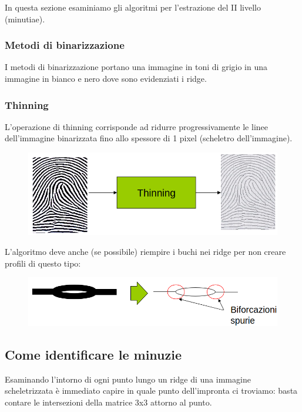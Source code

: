 In questa sezione esaminiamo gli algoritmi per l'estrazione del II livello (minutiae).

\subsubsection{Metodi di binarizzazione}

I metodi di binarizzazione portano una immagine in toni di
grigio in una immagine in bianco e nero dove sono
evidenziati i ridge.

\subsubsection{Thinning}

L’operazione di thinning corrisponde ad ridurre
progressivamente le linee dell’immagine
binarizzata fino allo spessore di 1 pixel (scheletro
dell’immagine).

\begin{figure}[ht]
    \centering
    \includegraphics[width=0.75\linewidth]{chapters/images-chap6/thinning.png}
\end{figure}

\newpage
\noindent L’algoritmo deve anche (se possibile) riempire i
buchi nei ridge per non creare profili di questo
tipo:
\begin{figure}[ht]
    \centering
    \includegraphics[width=1\linewidth]{chapters/images-chap6/thinning-bif.png}
\end{figure}


\subsection{Come identificare le minuzie}

Esaminando l’intorno di ogni punto lungo un ridge
di una immagine scheletrizzata è immediato capire in 
quale punto dell'impronta ci troviamo: basta contare le intersezioni
della matrice 3x3 attorno al punto.


